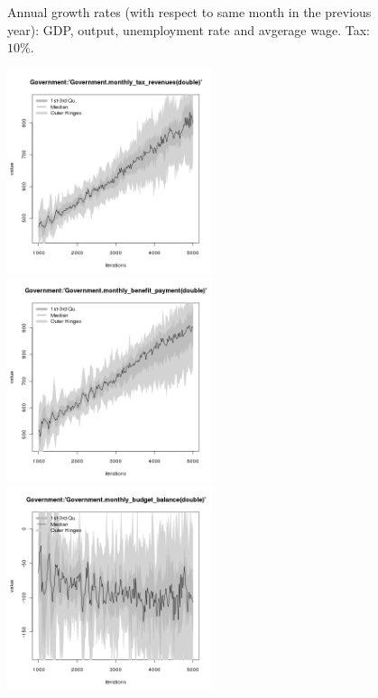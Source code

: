 \begin{figure}[H!]
\begin{minipage}{14cm}
\end{minipage}
\caption{Annual growth rates (with respect to same month in the previous year): GDP, output, unemployment rate and avgerage wage. Tax: $10\%$.}
\label{Figure: Eurostat macrodata growth rates}
\end{figure}
\clearpage

\begin{figure}[H!]
\centering\leavevmode
\begin{minipage}{14cm}
\centering\leavevmode
\includegraphics[width=6cm]{./png/tax_0.10/Government-monthly_tax_revenues.png}
\includegraphics[width=6cm]{./png/tax_0.10/Government-monthly_benefit_payment.png}\\
\includegraphics[width=6cm]{./png/tax_0.10/Government-monthly_budget_balance.png}

\end{minipage}
\end{figure}
